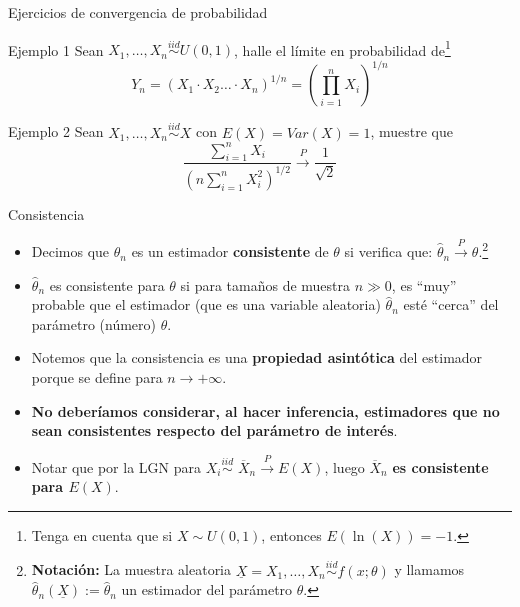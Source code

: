 \documentclass{beamer}
\theoremstyle{definition}
\newcommand{\cp}{\overset{P}{\rightarrow}}
\begin{document}
\begin{frame}{\color{rosee}Ejercicios de convergencia de probabilidad}\small
  \begin{exampleblock}{Ejemplo 1}
    Sean $X_{1},\dots,X_n\stackrel{iid}{\sim} U(0,1)$, halle el l\'imite en probabilidad de\footnote{Tenga en cuenta que si $X\sim U(0,1)$, entonces $E(\ln(X))=-1$.}
    \[Y_n=\left(X_{1} \cdot X_{2}\dots
      \cdot X_n\right)^{1/n}=\left(\prod_{i=1}^nX_{i} \right)^{1/n}\]
  \end{exampleblock}

  \begin{exampleblock}{Ejemplo 2}
    Sean $X_{1},\dots,X_n\stackrel{iid}{\sim} X$ con
     $E(X)=Var(X)=1$, muestre que
    \[\frac{\sum\limits_{i=1}^nX_{i}}{\left(n\sum\limits_{i=1}^nX_{i}^{2}
      \right)^{1/2}} \cp \frac{1}{\sqrt{2}}\]
  \end{exampleblock}
\end{frame}




\begin{frame}{\color{rosee}Consistencia}
  
  \begin{itemize}  
\item   Decimos que
    $\widehat{\theta}_n$ es un estimador \textbf{consistente} de $\theta$ si verifica que: $\widehat{\theta}_n\cp \theta$.\footnote{\textbf{Notación:} La muestra aleatoria $\underline{X}=X_{1},\dots, X_n\stackrel{iid}{\sim} f(x;\theta)$ y llamamos $\widehat{\theta}_n(\underline{X}):= \widehat{\theta}_n$ un estimador del par\'ametro $\theta$.}

  \medskip
  
\item  $\widehat{\theta}_n$ es consistente para $\theta$ si para tama\~nos de muestra $n\gg 0$, es ``muy'' probable que el estimador (que es una variable aleatoria) $\widehat{\theta}_n$  est\'e
    ``cerca'' del parámetro (número) $\theta$.  
    
    \item Notemos que la consistencia es una \textbf{propiedad asintótica} del estimador porque se define para $n\to+\infty$.
    
    \item \textbf{No deberíamos considerar, al hacer inferencia, estimadores que no sean consistentes respecto del parámetro de interés}.

     \medskip
    \item Notar que por la LGN para $X_i\stackrel{iid}{\sim}$ $\overline{X}_n \cp E(X)$, luego $\overline{X}_n$ \textbf{es consistente para $E(X)$}. 
  \end{itemize}

\end{frame}
\end{document}
